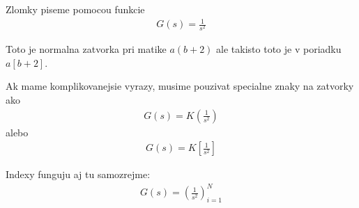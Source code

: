 \documentclass{book}
\begin{document}
Zlomky piseme pomocou funkcie
\begin{eqnarray}
G(s)=\frac{1}{s^2}
\end{eqnarray}

Toto je normalna zatvorka pri matike $a(b+2)$ ale takisto toto je v poriadku  $a[b+2]$.

Ak mame komplikovanejsie vyrazy, musime pouzivat specialne znaky na zatvorky ako
\begin{eqnarray}
G(s) = K\left( \frac{1}{s^2}  \right)
\end{eqnarray}
alebo
\begin{eqnarray}
G(s) = K\left[ \frac{1}{s^2}  \right]
\end{eqnarray}

Indexy funguju aj tu samozrejme:
\begin{eqnarray}
G(s) = \left( \frac{1}{s^2}  \right)^N_{i=1}
\end{eqnarray}
\end{document}
